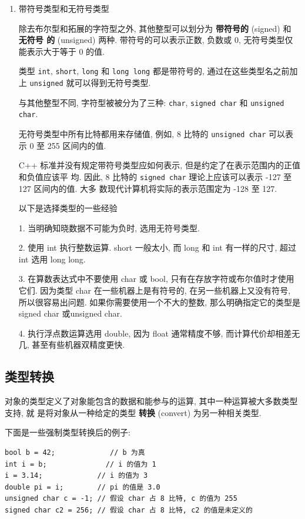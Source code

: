 \documentclass[lang=cn]{elegantbook}
\begin{document}
\begin{enumerate}
\item 带符号类型和无符号类型
\label{sec:orgfb55bb2}

除去布尔型和拓展的字符型之外, 其他整型可以划分为 \textbf{带符号的} (signed) 和 \textbf{无符号
的} (unsigned) 两种. 带符号的可以表示正数, 负数或 0, 无符号类型仅能表示大于等于
0 的值.

类型 \texttt{int}, \texttt{short}, \texttt{long} 和 \texttt{long long} 都是带符号的, 通过在这些类型名之前加
上 \texttt{unsigned} 就可以得到无符号类型.

与其他整型不同, 字符型被被分为了三种: \texttt{char}, \texttt{signed char} 和 \texttt{unsigned char}.

无符号类型中所有比特都用来存储值, 例如, 8 比特的 \texttt{unsigned char} 可以表示 0 至
255 区间内的值.

C++ 标准并没有规定带符号类型应如何表示, 但是约定了在表示范围内的正值和负值应该平
均. 因此, 8 比特的 \texttt{signed char} 理论上应该可以表示 -127 至 127 区间内的值. 大多
数现代计算机将实际的表示范围定为 -128 至 127.

\begin{definition}[如何选择类型]
以下是选择类型的一些经验

1. 当明确知晓数据不可能为负时, 选用无符号类型.

2. 使用 int 执行整数运算. short 一般太小, 而 long 和 int 有一样的尺寸, 超过 int 选用 long long.

3. 在算数表达式中不要使用 char 或 bool, 只有在存放字符或布尔值时才使用它们. 因为类型 char 在一些机器上是有符号的, 在另一些机器上又没有符号, 所以很容易出问题. 如果你需要使用一个不大的整数, 那么明确指定它的类型是 signed char 或unsigned char.

4. 执行浮点数运算选用 double, 因为 float 通常精度不够, 而计算代价却相差无几, 甚至有些机器双精度更快.
\end{definition}
\end{enumerate}

\subsection{类型转换}
\label{sec:org12d189f}

对象的类型定义了对象能包含的数据和能参与的运算, 其中一种运算被大多数类型支持, 就
是将对象从一种给定的类型 \textbf{转换} (convert) 为另一种相关类型.

下面是一些强制类型转换后的例子:

\begin{verbatim}
bool b = 42;             // b 为真
int i = b;              // i 的值为 1
i = 3.14;             // i 的值为 3
double pi = i;        // pi 的值是 3.0
unsigned char c = -1; // 假设 char 占 8 比特, c 的值为 255
signed char c2 = 256; // 假设 char 占 8 比特, c2 的值是未定义的
\end{verbatim}
\end{document}
